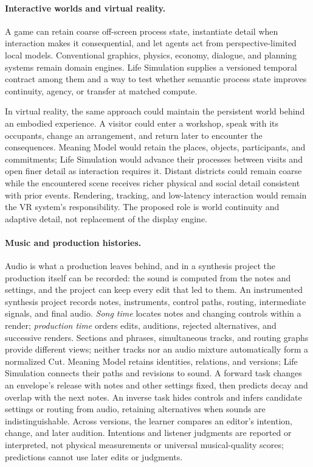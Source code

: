 \documentclass[10pt]{article}
\begin{document}
\paragraph{Interactive worlds and virtual reality.}
A game can retain coarse off-screen process state, instantiate detail when
interaction makes it consequential, and let agents act from perspective-limited
local models. Conventional graphics, physics, economy, dialogue, and planning
systems remain domain engines. Life Simulation supplies a versioned temporal
contract among them and a way to test whether semantic process state improves
continuity, agency, or transfer at matched compute.

In virtual reality, the same approach could maintain the persistent world
behind an embodied experience. A visitor could enter a workshop, speak with
its occupants, change an arrangement, and return later to encounter the
consequences. Meaning Model would retain the places, objects, participants,
and commitments; Life Simulation would advance their processes between visits
and open finer detail as interaction requires it. Distant districts could
remain coarse while the encountered scene receives richer physical and social
detail consistent with prior events. Rendering, tracking, and low-latency
interaction would remain the VR system's responsibility. The proposed role is
world continuity and adaptive detail, not replacement of the display engine.

\paragraph{Music and production histories.}
Audio is what a production leaves behind, and in a synthesis project the production
itself can be recorded: the sound is computed from the notes and settings, and the
project can keep every edit that led to them.
An instrumented synthesis project records notes, instruments, control paths,
routing, intermediate signals, and final audio. \emph{Song time} locates notes
and changing controls within a render; \emph{production time} orders edits,
auditions, rejected alternatives, and successive renders. Sections and phrases,
simultaneous tracks, and routing graphs provide different views; neither
tracks nor an audio mixture automatically form a normalized Cut. Meaning
Model retains identities, relations, and versions; Life Simulation connects
their paths and revisions to sound. A forward task changes an envelope's
release with notes and other settings fixed, then predicts decay and overlap
with the next notes.
An inverse task hides controls and infers candidate settings or routing from
audio, retaining alternatives when sounds are indistinguishable. Across
versions, the learner compares an editor's intention, change, and later
audition. Intentions and listener judgments are reported or interpreted, not
physical measurements or universal musical-quality scores; predictions cannot
use later edits or judgments.
\end{document}
